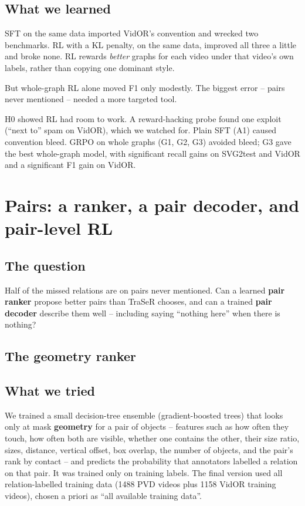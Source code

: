\documentclass[11pt,openany]{book}
\newcommand{\qsec}{\section*{The question}}
\newcommand{\tsec}{\section*{What we tried}}
\newcommand{\lsec}{\section*{What we learned}}
\begin{document}
\lsec
\begin{keyidea}
SFT on the same data imported VidOR's convention and wrecked two benchmarks. RL with a KL penalty, on the same data, improved all
three a little and broke none. RL rewards \emph{better} graphs for each video under that video's own labels, rather than copying one
dominant style.
\end{keyidea}
But whole-graph RL alone moved F1 only modestly. The biggest error -- pairs never mentioned -- needed a more targeted tool.

\begin{summarybox}
H0 showed RL had room to work. A reward-hacking probe found one exploit (``next to'' spam on VidOR), which we watched for. Plain SFT
(A1) caused convention bleed. GRPO on whole graphs (G1, G2, G3) avoided bleed; G3 gave the best whole-graph model, with significant
recall gains on SVG2test and VidOR and a significant F1 gain on VidOR.
\end{summarybox}

\chapter{Pairs: a ranker, a pair decoder, and pair-level RL}\label{ch:pairs}

\qsec
Half of the missed relations are on pairs never mentioned. Can a learned \textbf{pair ranker} propose better pairs than TraSeR
chooses, and can a trained \textbf{pair decoder} describe them well -- including saying ``nothing here'' when there is nothing?

\section{The geometry ranker}
\tsec
We trained a small decision-tree ensemble (gradient-boosted trees) that looks only at mask \textbf{geometry} for a pair of
objects -- features such as how often they touch, how often both are visible, whether one contains the other, their size ratio,
sizes, distance, vertical offset, box overlap, the number of objects, and the pair's rank by contact -- and predicts the
probability that annotators labelled a relation on that pair. It was trained only on training labels. The final version used all
relation-labelled training data (1488 PVD videos plus 1158 VidOR training videos), chosen a priori as ``all available training
data''.
\end{document}
